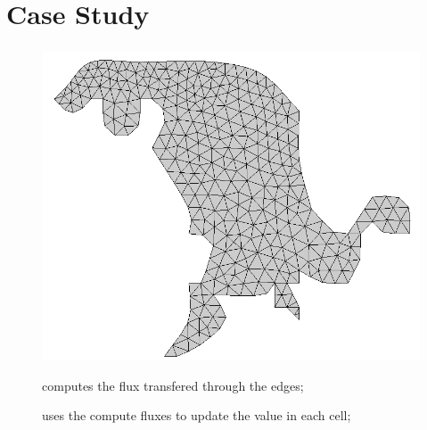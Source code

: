 \section{Case Study}

\begin{frame}[plain]
	\frametitle{\polu}
	\begin{figure}
		\centering
			\includegraphics[width=.6\textwidth]{images/foz_msh.png}
	\end{figure}

	\begin{description}
		\item [\computeflux] computes the flux transfered through the edges;
		\item [\update] uses the compute fluxes to update the value in each cell;
	\end{description}
\end{frame}
